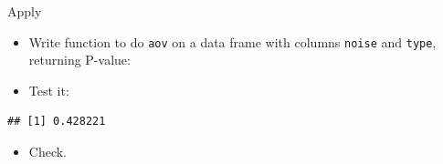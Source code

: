 \documentclass[
  ignorenonframetext,
]{beamer}
\newenvironment{Shaded}{\begin{snugshade}}{\end{snugshade}}
\newcommand{\ControlFlowTok}[1]{\textcolor[rgb]{0.13,0.29,0.53}{\textbf{#1}}}
\newcommand{\DataTypeTok}[1]{\textcolor[rgb]{0.13,0.29,0.53}{#1}}
\newcommand{\DecValTok}[1]{\textcolor[rgb]{0.00,0.00,0.81}{#1}}
\newcommand{\FloatTok}[1]{\textcolor[rgb]{0.00,0.00,0.81}{#1}}
\newcommand{\KeywordTok}[1]{\textcolor[rgb]{0.13,0.29,0.53}{\textbf{#1}}}
\newcommand{\NormalTok}[1]{#1}
\newcommand{\OperatorTok}[1]{\textcolor[rgb]{0.81,0.36,0.00}{\textbf{#1}}}
\newcommand{\StringTok}[1]{\textcolor[rgb]{0.31,0.60,0.02}{#1}}
\providecommand{\tightlist}{%
  \setlength{\itemsep}{0pt}\setlength{\parskip}{0pt}}
\begin{document}
\begin{frame}[fragile]{Apply}
\protect\hypertarget{apply}{}

\begin{itemize}
\tightlist
\item
  Write function to do \texttt{aov} on a data frame with columns
  \texttt{noise} and \texttt{type}, returning P-value:
\end{itemize}

\begin{Shaded}
\end{Shaded}

\begin{itemize}
\tightlist
\item
  Test it:
\end{itemize}

\begin{Shaded}
\end{Shaded}

\begin{verbatim}
## [1] 0.428221
\end{verbatim}

\begin{itemize}
\tightlist
\item
  Check.
\end{itemize}

\end{frame}
\end{document}
